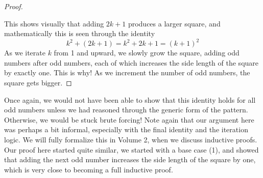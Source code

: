 \begin{proof}
\begin{center}
\end{center}
This shows visually that adding $2k+1$ produces a larger square, and mathematically this is seen through the identity
\[
k^2 + (2k+1) = k^2 + 2k + 1 = (k+1)^2
\]
As we iterate $k$ from 1 and upward, we slowly grow the square, adding odd numbers after odd numbers, each of which increases the side length of the square by exactly one. This is why! As we increment the number of odd numbers, the square gets bigger. 
\end{proof}

Once again, we would not have been able to show that this identity holds for all odd numbers unless we had reasoned through the generic form of the pattern. Otherwise, we would be stuck brute forcing! Note again that our argument here was perhaps a bit informal, especially with the final identity and the iteration logic. We will fully formalize this in Volume 2, when we discuss inductive proofs. Our proof here started quite similar, we started with a base case (1), and showed that adding the next odd number increases the side length of the square by one, which is very close to becoming a full inductive proof. 

